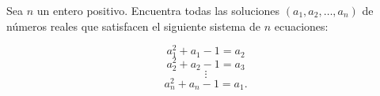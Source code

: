 Sea $n$ un entero positivo. Encuentra todas las soluciones $(a_1, a_2,\dots , a_n)$ de números reales
que satisfacen el siguiente sistema de $n$ ecuaciones:

\[a_1^2 + a_1 - 1 = a_2\]
\[ a_2^2 + a_2 - 1 = a_3\]
\[\vdots \]
\[a_{n}^2 + a_n - 1 = a_1.\]

